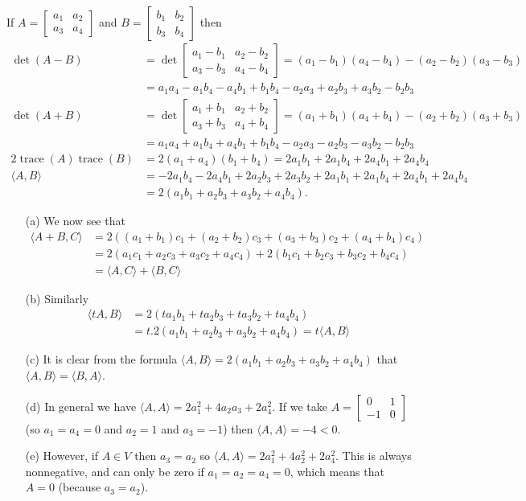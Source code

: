 \documentclass{amsart}
\newcommand{\trc}       {\operatorname{trace}}
\newcommand{\bsm}       {\left[\begin{smallmatrix}}
\newcommand{\esm}       {\end{smallmatrix}\right]}
\newcommand{\ip}[1]     {\langle #1\rangle}
\renewcommand{\:}       {\colon}
\theoremstyle{definition}
\renewenvironment{solution}{\SolutionAtEnd}{\endSolutionAtEnd}
\begin{document}
\begin{solution}
 If $A=\bsm a_1&a_2\\a_3&a_4\esm$ and
 $B=\bsm b_1&b_2\\ b_3&b_4\esm$ then
 \begin{align*}
  \det(A-B)
    &= \det\bsm a_1-b_1&a_2-b_2\\a_3-b_3&a_4-b_4\esm 
     = (a_1-b_1)(a_4-b_4)-(a_2-b_2)(a_3-b_3) \\
    &= a_1a_4-a_1b_4-a_4b_1+b_1b_4
       -a_2a_3+a_2b_3+a_3b_2-b_2b_3 \\
  \det(A+B)
    &= \det\bsm a_1+b_1&a_2+b_2\\a_3+b_3&a_4+b_4\esm 
     = (a_1+b_1)(a_4+b_4)-(a_2+b_2)(a_3+b_3) \\
    &= a_1a_4+a_1b_4+a_4b_1+b_1b_4
       -a_2a_3-a_2b_3-a_3b_2-b_2b_3 \\
  2\trc(A)\trc(B)
    &= 2(a_1+a_4)(b_1+b_4)
     = 2a_1b_1 + 2a_1b_4 + 2a_4b_1 + 2 a_4b_4 \\
  \ip{A,B} 
    &= -2a_1b_4 -2a_4b_1 + 2a_2b_3 + 2a_3b_2 +
       2a_1b_1 + 2a_1b_4 + 2a_4b_1 + 2 a_4b_4 \\
    &= 2(a_1b_1+a_2b_3+a_3b_2+a_4b_4).
 \end{align*}
 \begin{itemize}
  \item[(a)] We now see that 
   \begin{align*}
    \ip{A+B,C}
     &= 2((a_1+b_1)c_1+(a_2+b_2)c_3+(a_3+b_3)c_2+(a_4+b_4)c_4)\\
     &= 2(a_1c_1+a_2c_3+a_3c_2+a_4c_4) + 
        2(b_1c_1+b_2c_3+b_3c_2+b_4c_4) \\
     &= \ip{A,C} + \ip{B,C}
   \end{align*}
  \item[(b)] Similarly
   \begin{align*}
    \ip{tA,B}
     &= 2(ta_1b_1+ta_2b_3+ta_3b_2+ta_4b_4) \\
     &= t.2(a_1b_1+a_2b_3+a_3b_2+a_4b_4) = t\ip{A,B} 
   \end{align*}
  \item[(c)] It is clear from the formula
   $\ip{A,B}=2(a_1b_1+a_2b_3+a_3b_2+a_4b_4)$ that
   $\ip{A,B}=\ip{B,A}$.
  \item[(d)] In general we have
   $\ip{A,A}=2a_1^2+4a_2a_3+2a_4^2$.  If we take
   $A=\bsm 0&1\\-1&0\esm$ (so $a_1=a_4=0$ and $a_2=1$ and
   $a_3=-1$) then $\ip{A,A}=-4<0$.
  \item[(e)] However, if $A\in V$ then $a_3=a_2$ so
   $\ip{A,A}=2a_1^2+4a_2^2+2a_4^2$.  This is always
   nonnegative, and can only be zero if $a_1=a_2=a_4=0$,
   which means that $A=0$ (because $a_3=a_2$).
 \end{itemize}
\end{solution}
\end{document}
